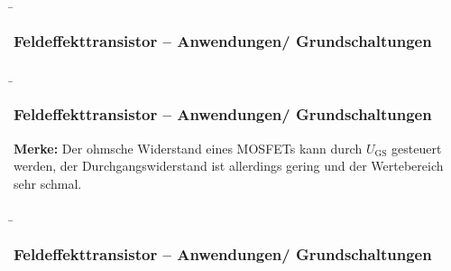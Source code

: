 \begin{frame}
    \b{ \frametitle{Feldeffekttransistor -- Anwendungen/ Grundschaltungen}
        \begin{figure}[H]
            \centering
            \begin{minipage}[c]{.48\textwidth}
                \centering
                
            \end{minipage}
            \begin{minipage}[c]{.48\textwidth}
                \centering
                
            \end{minipage}
        
        \end{figure}
    }
\end{frame}

\begin{frame}
    \b{\frametitle{Feldeffekttransistor -- Anwendungen/ Grundschaltungen}
        \textbf{Merke:}
        Der ohmsche Widerstand eines MOSFETs kann durch $U_\mathrm{GS}$ gesteuert werden, 
        der Durchgangswiderstand ist allerdings gering und der Wertebereich sehr schmal.  
        }
\end{frame}

\begin{frame}
    \b{ \frametitle{Feldeffekttransistor -- Anwendungen/ Grundschaltungen}
        \begin{figure}[H]
            \centering
            \begin{minipage}[c]{.48\textwidth}
                \centering
                
            \end{minipage}
            \begin{minipage}[c]{.48\textwidth}
                \centering
                
            \end{minipage}
        
        \end{figure}
    }
\end{frame}

